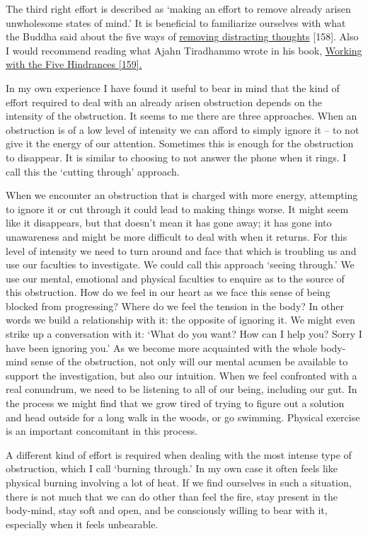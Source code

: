 The third right effort is described as `making an effort to remove
already arisen unwholesome states of mind.' It is beneficial to
familiarize ourselves with what the Buddha said about the five ways of
\href{https://www.accesstoinsight.org/tipitaka/mn/mn.020.soma.html}{\underline{removing
distracting thoughts}} {[}158{]}. Also I would recommend reading what
Ajahn Tiradhammo wrote in his book,
\href{https://forestsangha.org/teachings/books/working-with-the-five-hindrances?language=English}{\underline{Working
with the Five Hindrances} {[}159{]}.}

In my own experience I have found it useful to bear in mind that the
kind of effort required to deal with an already arisen obstruction
depends on the intensity of the obstruction. It seems to me there are
three approaches. When an obstruction is of a low level of intensity we
can afford to simply ignore it -- to not give it the energy of our
attention. Sometimes this is enough for the obstruction to disappear. It
is similar to choosing to not answer the phone when it rings. I call
this the `cutting through' approach.

When we encounter an obstruction that is charged with more energy,
attempting to ignore it or cut through it could lead to making things
worse. It might seem like it disappears, but that doesn't mean it has
gone away; it has gone into unawareness and might be more difficult to
deal with when it returns. For this level of intensity we need to turn
around and face that which is troubling us and use our faculties to
investigate. We could call this approach `seeing through.' We use our
mental, emotional and physical faculties to enquire as to the source of
this obstruction. How do we feel in our heart as we face this sense of
being blocked from progressing? Where do we feel the tension in the
body? In other words we build a relationship with it: the opposite of
ignoring it. We might even strike up a conversation with it: `What do
you want? How can I help you? Sorry I have been ignoring you.' As we
become more acquainted with the whole body-mind sense of the
obstruction, not only will our mental acumen be available to support the
investigation, but also our intuition. When we feel confronted with a
real conundrum, we need to be listening to all of our being, including
our gut. In the process we might find that we grow tired of trying to
figure out a solution and head outside for a long walk in the woods, or
go swimming. Physical exercise is an important concomitant in this
process.

A different kind of effort is required when dealing with the most
intense type of obstruction, which I call `burning through.' In my own
case it often feels like physical burning involving a lot of heat. If we
find ourselves in such a situation, there is not much that we can do
other than feel the fire, stay present in the body-mind, stay soft and
open, and be consciously willing to bear with it, especially when it
feels unbearable.

